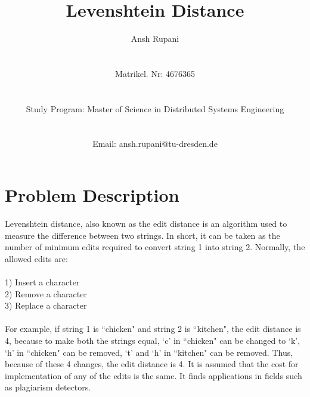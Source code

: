 \documentclass[a4paper,10pt,twoside]{article}
\title{Levenshtein Distance}
\author{Ansh Rupani \\ \\ \\Matrikel. Nr: 4676365 \\ \\ \\Study Program: Master of Science in Distributed Systems Engineering \\ \\ \\Email: ansh.rupani@tu-dresden.de}
\begin{document}
\maketitle


%

\pagebreak

\tableofcontents

\newpage

\section{Problem Description}

Levenshtein distance, also known as the edit distance is an algorithm  used to measure the difference between two strings. In short, it can be taken as the number of minimum edits required to convert string 1 into string 2. Normally, the allowed edits are:\\ \\
1) Insert a character\\
2) Remove a character\\
3) Replace a character\\ \\
For example, if string 1 is ``chicken" and string 2 is ``kitchen", the edit distance is 4, because to make both the strings equal, `c' in ``chicken" can be changed to `k', `h' in ``chicken" can be removed, `t' and `h' in ``kitchen" can be removed. Thus, because of these 4 changes, the edit distance is 4. It is assumed that the cost for implementation of any of the edits is the same. It finds applications in fields such as plagiarism detectors.
\end{document}
